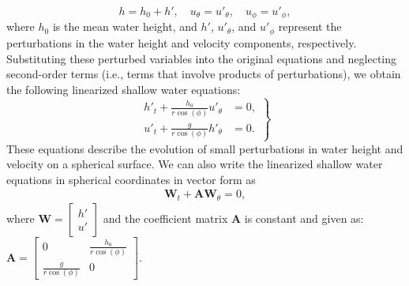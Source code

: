 \[
h = h_0 + h', \quad u_\theta = u'_\theta, \quad u_\phi = u'_\phi,
\]
where \( h_0 \) is the mean water height, and \( h' \), \( u'_\theta \), and \( u'_\phi \) represent the perturbations in the water height and velocity components, respectively.
Substituting these perturbed variables into the original equations and neglecting second-order terms (i.e., terms that involve products of perturbations), we obtain the following linearized shallow water equations:
\begin{equation}\label{eq:linearized_swe_spherical}
    \left.
    \begin{aligned}
        h'_t + \frac{h_0}{r \cos(\phi)} u'_\theta &= 0, \\
        u'_t + \frac{g}{r \cos(\phi)} h'_\theta &= 0.
    \end{aligned}
    \right\}
\end{equation}
These equations describe the evolution of small perturbations in water height and velocity on a spherical surface.
We can also write the linearized shallow water equations in spherical coordinates in vector form as
\begin{align}\label{eq:linearized_swe_spherical_vector}
    \mathbf{W}_t + \mathbf{A} \mathbf{W}_\theta = 0,
\end{align}
where $\mathbf{W} =
\begin{bmatrix} h' \\ u' \end{bmatrix}$ and the coefficient matrix $\mathbf{A}$ is constant and given as:
$\mathbf{A} = \begin{bmatrix} 0 & \frac{h_0}{r \cos(\phi)} \\ \frac{g}{r \cos (\phi)} & 0 \end{bmatrix}$.


